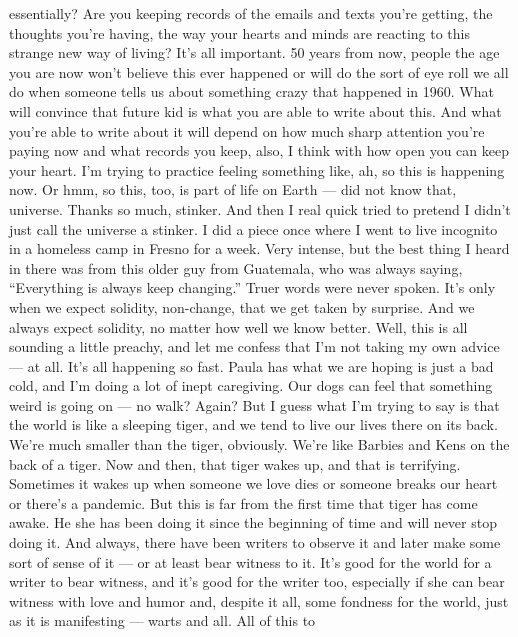 \begin{itemize}
  essentially? Are you keeping records of the emails and texts you're
  getting, the thoughts you're having, the way your hearts and minds are
  reacting to this strange new way of living? It's all important. 50
  years from now, people the age you are now won't believe this ever
  happened or will do the sort of eye roll we all do when someone tells
  us about something crazy that happened in 1960. What will convince
  that future kid is what you are able to write about this. And what
  you're able to write about it will depend on how much sharp attention
  you're paying now and what records you keep, also, I think with how
  open you can keep your heart. I'm trying to practice feeling something
  like, ah, so this is happening now. Or hmm, so this, too, is part of
  life on Earth --- did not know that, universe. Thanks so much,
  stinker. And then I real quick tried to pretend I didn't just call the
  universe a stinker. I did a piece once where I went to live incognito
  in a homeless camp in Fresno for a week. Very intense, but the best
  thing I heard in there was from this older guy from Guatemala, who was
  always saying, ``Everything is always keep changing.'' Truer words
  were never spoken. It's only when we expect solidity, non-change, that
  we get taken by surprise. And we always expect solidity, no matter how
  well we know better. Well, this is all sounding a little preachy, and
  let me confess that I'm not taking my own advice --- at all. It's all
  happening so fast. Paula has what we are hoping is just a bad cold,
  and I'm doing a lot of inept caregiving. Our dogs can feel that
  something weird is going on --- no walk? Again? But I guess what I'm
  trying to say is that the world is like a sleeping tiger, and we tend
  to live our lives there on its back. We're much smaller than the
  tiger, obviously. We're like Barbies and Kens on the back of a tiger.
  Now and then, that tiger wakes up, and that is terrifying. Sometimes
  it wakes up when someone we love dies or someone breaks our heart or
  there's a pandemic. But this is far from the first time that tiger has
  come awake. He she has been doing it since the beginning of time and
  will never stop doing it. And always, there have been writers to
  observe it and later make some sort of sense of it --- or at least
  bear witness to it. It's good for the world for a writer to bear
  witness, and it's good for the writer too, especially if she can bear
  witness with love and humor and, despite it all, some fondness for the
  world, just as it is manifesting --- warts and all. All of this to

\end{itemize}
